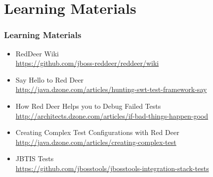 \documentclass{beamer}
\begin{document}
\section{Learning Materials}
\begin{frame}[fragile]
\frametitle{Learning Materials}
\begin{itemize}
\item RedDeer Wiki\\\url{https://github.com/jboss-reddeer/reddeer/wiki}
\item Say Hello to Red Deer\\\url{http://java.dzone.com/articles/hunting-swt-test-framework-say}
\item How Red Deer Helps you to Debug Failed Tests\\\url{http://architects.dzone.com/articles/if-bad-things-happen-good}
\item Creating Complex Test Configurations with Red Deer\\\url{http://java.dzone.com/articles/creating-complex-test}
\item JBTIS Tests\\\url{https://github.com/jbosstools/jbosstools-integration-stack-tests}
\end{itemize}
\end{frame}
\end{document}
